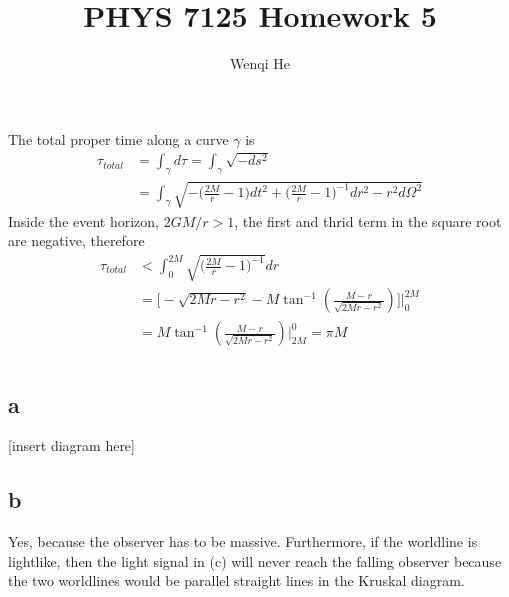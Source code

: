 \documentclass{article}
\title{PHYS 7125 Homework 5}
\author{Wenqi He}
\begin{document}
\maketitle
\section{}
The total proper time along a curve $\gamma$ is
\begin{align*}
\tau_{total} &= \int_\gamma d\tau = \int_\gamma \sqrt{-ds^2} \\
&= \int_\gamma \sqrt{-\Big(\frac{2M}{r} - 1\Big)dt^2 + \Big(\frac{2M}{r} -1 \Big)^{-1} dr^2 - r^2d\Omega^2}
\end{align*}
Inside the event horizon, $2GM/r > 1$, the first and thrid term in the square root are negative, therefore
\begin{align*}
\tau_{total} &< \int^{2M}_0 \sqrt{\Big(\frac{2M}{r} -1 \Big)^{-1}} dr  \\
&= \Bigg[-\sqrt{2Mr - r^2} - M \tan^{-1} \left(\frac{M-r}{\sqrt{2Mr - r^2}}\right) \Bigg] \Bigg\rvert^{2M}_0 \\
&= M \tan^{-1} \left(\frac{M-r}{\sqrt{2Mr - r^2}}\right) \Bigg\rvert_{2M}^0 = \pi M
\end{align*}
\section{}
\subsection*{a}
[insert diagram here]
\subsection*{b}
Yes, because the observer has to be massive. Furthermore, if the worldline is lightlike, then the light signal in (c) will never reach the falling observer because the two worldlines would be parallel straight lines in the Kruskal diagram.
\end{document}

